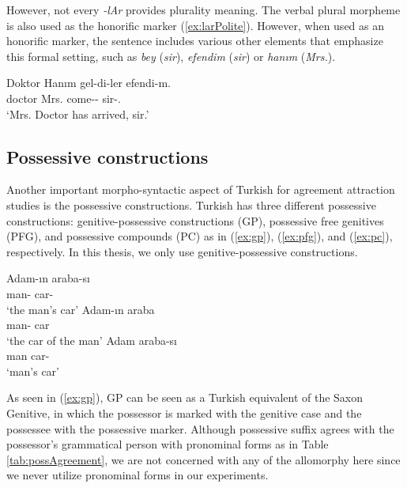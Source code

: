 However, not every \emph{-lAr} provides plurality meaning. The verbal plural morpheme is also used as the honorific marker (\ref{ex:larPolite}). However, when used as an honorific marker, the sentence includes various other elements that emphasize this formal setting, such as \textit{bey} (\emph{sir}), \textit{efendim} (\emph{sir}) or \textit{han{\i}m} (\emph{Mrs.}).

\ea \label{ex:larPolite}
  \gll Doktor Han{\i}m gel-di-ler efendi-m.\\
  doctor Mrs. come-\Pst{}-\Hon{} sir-\Poss.\Fsg{}\\
  \glt `Mrs. Doctor has arrived, sir.'
\z


\subsection{Possessive constructions}

Another important morpho-syntactic aspect of Turkish for agreement attraction studies is the possessive constructions. Turkish has three different possessive constructions: genitive-possessive constructions (GP), possessive free genitives (PFG), and possessive compounds (PC) as in (\ref{ex:gp}), (\ref{ex:pfg}), and (\ref{ex:pc}), respectively. In this thesis, we only use genitive-possessive constructions. 

\ea \label{ex:possConstructions}
  \ea \label{ex:gp}
    \gll Adam-{\i}n araba-s{\i}\\
    man-\Gen{} car-\Poss{}\\
    \glt `the man's car'
  \ex \label{ex:pfg}
    \gll Adam-{\i}n araba\\
    man-\Gen{} car\\
    \glt `the car of the man'
  \ex \label{ex:pc}
    \gll Adam araba-s{\i}\\
    man car-\Poss{}\\
    \glt `man's car'
  \z
\z

As seen in (\ref{ex:gp}), GP can be seen as a Turkish equivalent of the Saxon Genitive, in which the possessor is marked with the genitive case and the possessee with the possessive marker. Although possessive suffix agrees with the possessor's grammatical person with pronominal forms as in Table \ref{tab:possAgreement}, we are not concerned with any of the allomorphy here since we never utilize pronominal forms in our experiments. 

